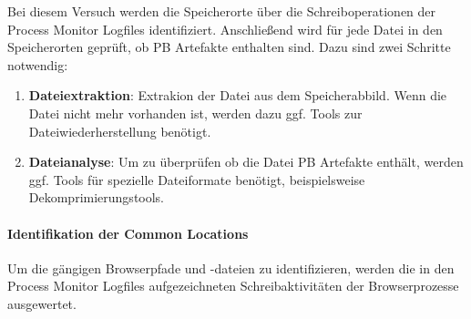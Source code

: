 Bei diesem Versuch werden die Speicherorte über die Schreiboperationen der Process Monitor Logfiles identifiziert.
Anschließend wird für jede Datei in den Speicherorten geprüft, ob PB Artefakte enthalten sind.
Dazu sind zwei Schritte notwendig:
\begin{enumerate}
\item \textbf{Dateiextraktion}: Extrakion der Datei aus dem Speicherabbild. Wenn die Datei nicht mehr vorhanden ist, werden dazu ggf. Tools zur Dateiwiederherstellung benötigt.
\item \textbf{Dateianalyse}: Um zu überprüfen ob die Datei PB Artefakte enthält, werden ggf. Tools für spezielle Dateiformate benötigt, beispielsweise Dekomprimierungstools.
\end{enumerate}

\paragraph*{Identifikation der Common Locations}
Um die gängigen Browserpfade und -dateien zu identifizieren, werden die in den Process Monitor Logfiles aufgezeichneten Schreibaktivitäten der Browserprozesse ausgewertet.

